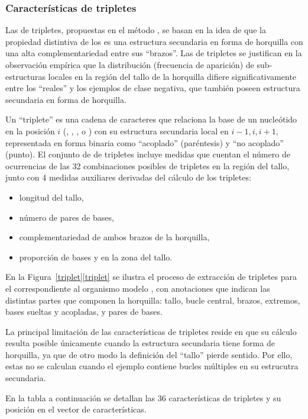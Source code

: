 %
%
\subsubsection{Características de tripletes}
%
Las  de tripletes, propuestas en el método 
\cite{xue}, se basan en la idea de que la propiedad distintiva de los
 es una estructura secundaria en forma de horquilla con
una alta complementariedad entre sus ``brazos''.
Las  de tripletes se justifican en la observación empírica
que la distribución (frecuencia de aparición) de sub-estructuras
locales en la región del tallo de la horquilla difiere
significativamente entre los  ``reales'' y los ejemplos de
clase negativa, que también poseen estructura secundaria en forma de
horquilla.


Un ``triplete'' es una cadena de caracteres que relaciona la base de
un nucleótido en la posición $i$ (\ntA, \ntC, \ntG, o \ntU) con su
estructura secundaria local en $i-1,i,i+1$, representada en forma
binaria como ``acoplado'' \pairL (paréntesis) y ``no acoplado''
\noPair (punto).
El conjunto de  de tripletes incluye medidas que cuentan
el número de ocurrencias de las 32 combinaciones posibles de tripletes
en la región del tallo, junto con 4 medidas auxiliares derivadas
del cálculo de los tripletes:
%
\begin{itemize}
\item longitud del tallo,
\item número de pares de bases,
\item complementariedad de ambos brazos de la horquilla,
\item proporción de bases \ntG y \ntC en la zona del tallo.
\end{itemize}
%

En la \iflatexml{}Figura~\ref{triplet}\else\autoref{triplet}\fi{} se
ilustra el proceso de extracción de tripletes para el \premirna{}
 correspondiente al organismo modelo 
\cite{mirbase1}, con anotaciones que indican las distintas partes que
componen la horquilla: tallo, bucle central, brazos, extremos, bases
sueltas y acopladas, y pares de bases.

La principal limitación de las características de tripletes reside en
que su cálculo resulta posible únicamente cuando la estructura
secundaria tiene forma de horquilla, ya que de otro modo la definición
del ``tallo'' pierde sentido. Por ello, estas  no se
calculan cuando el ejemplo contiene bucles múltiples en su estrucutra
secundaria.

En la tabla a continuación se detallan las 36 características de
tripletes y su posición en el vector de características.
